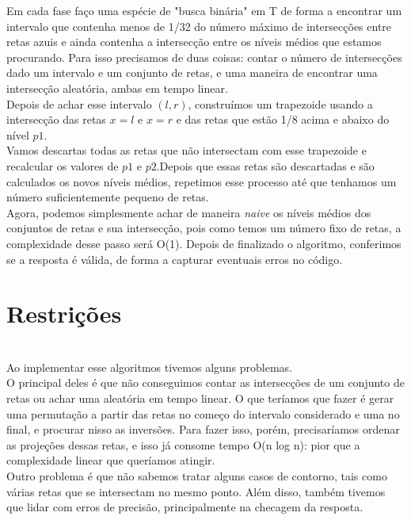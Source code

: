 \documentclass{article}
\begin{document}
Em cada fase faço uma espécie de "busca binária" em T de forma a encontrar um intervalo que contenha menos de 1/32 do número máximo de intersecções entre retas azuis e ainda contenha a intersecção entre os níveis médios que estamos procurando. Para isso precisamos de duas coisas: contar o número de intersecções dado um intervalo e um conjunto de retas, e uma maneira de encontrar uma intersecção aleatória, ambas em tempo linear.\\

Depois de achar esse intervalo $(l, r)$, construímos um trapezoide usando a intersecção das retas $x = l$ e $x = r$ e das retas que estão 1/8 acima e abaixo do nível $p1$.\\

Vamos descartas todas as retas que não intersectam com esse trapezoide e recalcular os valores de $p1$ e $p2$.Depois que essas retas são descartadas e são calculados os novos níveis médios, repetimos esse processo até que tenhamos um número suficientemente pequeno de retas.\\

Agora, podemos simplesmente achar de maneira \textit{naive} os níveis médios dos conjuntos de retas e sua intersecção, pois como temos um número fixo de retas, a complexidade desse passo será O(1). Depois de finalizado o algoritmo, conferimos se a resposta é válida, de forma a capturar eventuais erros no código.

\section{Restrições}\\

Ao implementar esse algoritmos tivemos alguns problemas.\\

O principal deles é que não conseguimos contar as intersecções de um conjunto de retas ou achar uma aleatória em tempo linear. O que teríamos que fazer é gerar uma permutação a partir das retas no começo do intervalo considerado e uma no final, e procurar nisso as inversões. Para fazer isso, porém, precisaríamos ordenar as projeções dessas retas, e isso já consome tempo O(n log n): pior que a complexidade linear que queríamos atingir.\\

Outro problema é que não sabemos tratar alguns casos de contorno, tais como várias retas que se intersectam no mesmo ponto. Além disso, também tivemos que lidar com erros de precisão, principalmente na checagem da resposta.
\end{document}
